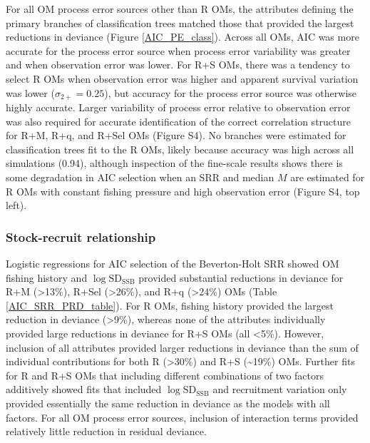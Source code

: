\documentclass[
  12pt,
]{article}
\begin{document}
For all OM process error sources other than R OMs, the attributes
defining the primary branches of classification trees matched those that
provided the largest reductions in deviance (Figure \ref{AIC_PE_class}).
Across all OMs, AIC was more accurate for the process error source when
process error variability was greater and when observation error was
lower. For R+S OMs, there was a tendency to select R OMs when
observation error was higher and apparent survival variation was lower
(\(\sigma_{2+} = 0.25\)), but accuracy for the process error source was
otherwise highly accurate. Larger variability of process error relative
to observation error was also required for accurate identification of
the correct correlation structure for R+M, R+q, and R+Sel OMs (Figure
S4). No branches were estimated for classification trees fit to the R
OMs, likely because accuracy was high across all simulations (0.94),
although inspection of the fine-scale results shows there is some
degradation in AIC selection when an SRR and median \(M\) are estimated
for R OMs with constant fishing pressure and high observation error
(Figure S4, top left).

\subsubsection*{Stock-recruit
relationship}\label{stock-recruit-relationship}

Logistic regressions for AIC selection of the Beverton-Holt SRR showed
OM fishing history and \(\log \text{SD}_{\text{SSB}}\) provided
substantial reductions in deviance for R+M (\textgreater13\%), R+Sel
(\textgreater26\%), and R+q (\textgreater24\%) OMs (Table
\ref{AIC_SRR_PRD_table}). For R OMs, fishing history provided the
largest reduction in deviance (\textgreater9\%), whereas none of the
attributes individually provided large reductions in deviance for R+S
OMs (all \textless5\%). However, inclusion of all attributes provided
larger reductions in deviance than the sum of individual contributions
for both R (\textgreater30\%) and R+S (\textasciitilde19\%) OMs. Further
fits for R and R+S OMs that including different combinations of two
factors additively showed fits that included
\(\log \text{SD}_{\text{SSB}}\) and recruitment variation only provided
essentially the same reduction in deviance as the models with all
factors. For all OM process error sources, inclusion of interaction
terms provided relatively little reduction in residual deviance.
\end{document}
